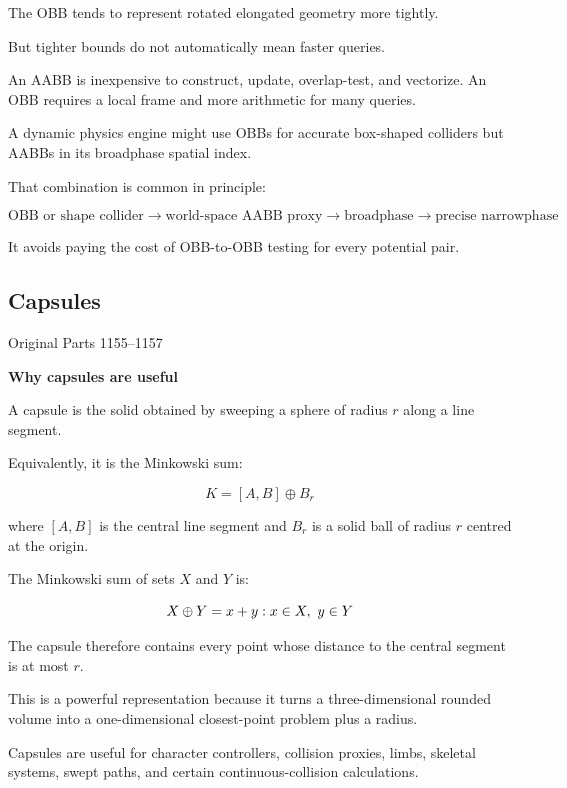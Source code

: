 The OBB tends to represent rotated elongated geometry more tightly.

But tighter bounds do not automatically mean faster queries.

An AABB is inexpensive to construct, update, overlap-test, and vectorize. An OBB requires a local frame and more arithmetic for many queries.

A dynamic physics engine might use OBBs for accurate box-shaped colliders but AABBs in its broadphase spatial index.

That combination is common in principle:

\[
\text{OBB or shape collider} \rightarrow \text{world-space AABB proxy} \rightarrow \text{broadphase} \rightarrow \text{precise narrowphase}
\]

It avoids paying the cost of OBB-to-OBB testing for every potential pair.

\subsection{Capsules}\label{03-visual-computing-i-ch021-capsules}

\hypertarget{03-visual-computing-i-ch021-capsules}{}

Original Parts 1155--1157

\textbf{Why capsules are useful}

A capsule is the solid obtained by sweeping a sphere of radius \(r\) along a line segment.

Equivalently, it is the Minkowski sum:

\[
\boxed{ K=[A,B]\oplus B_r }
\]

where \([A,B]\) is the central line segment and \(B_r\) is a solid ball of radius \(r\) centred at the origin.

The Minkowski sum of sets \(X\) and \(Y\) is:

\[
X\oplus Y=\\{x+y:x\in X,\ y\in Y\\}
\]

The capsule therefore contains every point whose distance to the central segment is at most \(r\).

This is a powerful representation because it turns a three-dimensional rounded volume into a one-dimensional closest-point problem plus a radius.

Capsules are useful for character controllers, collision proxies, limbs, skeletal systems, swept paths, and certain continuous-collision calculations.

